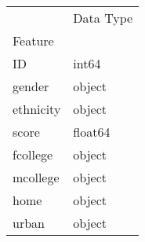 \begin{tabu}{ll}
\toprule
 & Data Type \\
Feature &  \\
\midrule
ID & int64 \\
gender & object \\
ethnicity & object \\
score & float64 \\
fcollege & object \\
mcollege & object \\
home & object \\
urban & object \\
\bottomrule
\end{tabu}